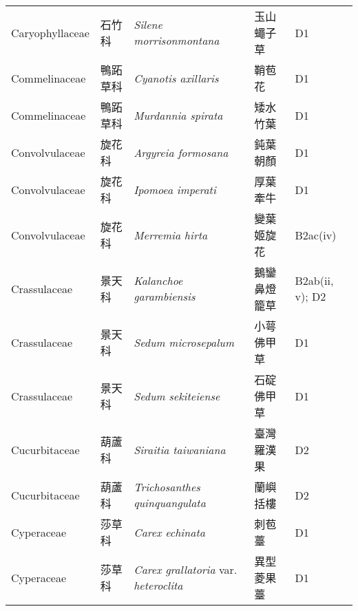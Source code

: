 {\begin{longtable}{p{2.5cm}p{2.5cm}p{4.5cm}p{2.5cm}p{3cm}}
    Caryophyllaceae & 石竹科 & \textit{Silene morrisonmontana}  & 玉山蠅子草 & D1 \index{Silene@\textit{Silene}!morrisonmontana@\textit{morrisonmontana}}  \index{玉山蠅子草} \\
    Commelinaceae & 鴨跖草科 & \textit{Cyanotis axillaris}  & 鞘苞花 & D1 \index{Cyanotis@\textit{Cyanotis}!axillaris@\textit{axillaris}}  \index{鞘苞花} \\
    Commelinaceae & 鴨跖草科 & \textit{Murdannia spirata}  & 矮水竹葉 & D1 \index{Murdannia@\textit{Murdannia}!spirata@\textit{spirata}}  \index{矮水竹葉} \\
    Convolvulaceae & 旋花科 & \textit{Argyreia formosana}  & 鈍葉朝顏 & D1 \index{Argyreia@\textit{Argyreia}!formosana@\textit{formosana}}  \index{鈍葉朝顏} \\
    Convolvulaceae & 旋花科 & \textit{Ipomoea imperati}  & 厚葉牽牛 & D1 \index{Ipomoea@\textit{Ipomoea}!imperati@\textit{imperati}}  \index{厚葉牽牛} \\
    Convolvulaceae & 旋花科 & \textit{Merremia hirta}  & 變葉姬旋花 & B2ac(iv) \index{Merremia@\textit{Merremia}!hirta@\textit{hirta}}  \index{變葉姬旋花} \\
    Crassulaceae & 景天科 & \textit{Kalanchoe garambiensis}  & 鵝鑾鼻燈籠草 & B2ab(ii, v); D2 \index{Kalanchoe@\textit{Kalanchoe}!garambiensis@\textit{garambiensis}}  \index{鵝鑾鼻燈籠草} \\
    Crassulaceae & 景天科 & \textit{Sedum microsepalum}  & 小萼佛甲草 & D1 \index{Sedum@\textit{Sedum}!microsepalum@\textit{microsepalum}}  \index{小萼佛甲草} \\
    Crassulaceae & 景天科 & \textit{Sedum sekiteiense}  & 石碇佛甲草 & D1 \index{Sedum@\textit{Sedum}!sekiteiense@\textit{sekiteiense}}  \index{石碇佛甲草} \\
    Cucurbitaceae & 葫蘆科 & \textit{Siraitia taiwaniana}  & 臺灣羅漢果 & D2 \index{Siraitia@\textit{Siraitia}!taiwaniana@\textit{taiwaniana}}  \index{臺灣羅漢果} \\
    Cucurbitaceae & 葫蘆科 & \textit{Trichosanthes quinquangulata}  & 蘭嶼括樓 & D2 \index{Trichosanthes@\textit{Trichosanthes}!quinquangulata@\textit{quinquangulata}}  \index{蘭嶼括樓} \\
    Cyperaceae & 莎草科 & \textit{Carex echinata}  & 刺苞薹 & D1 \index{Carex@\textit{Carex}!echinata@\textit{echinata}}  \index{刺苞薹} \\
    Cyperaceae & 莎草科 & \textit{Carex grallatoria} var. \textit{heteroclita}  & 異型菱果薹 & D1 \index{Carex@\textit{Carex}!grallatoria@\textit{grallatoria}!var. heteroclita@var. \textit{heteroclita}}  \index{異型菱果薹} \\

\end{longtable}}
